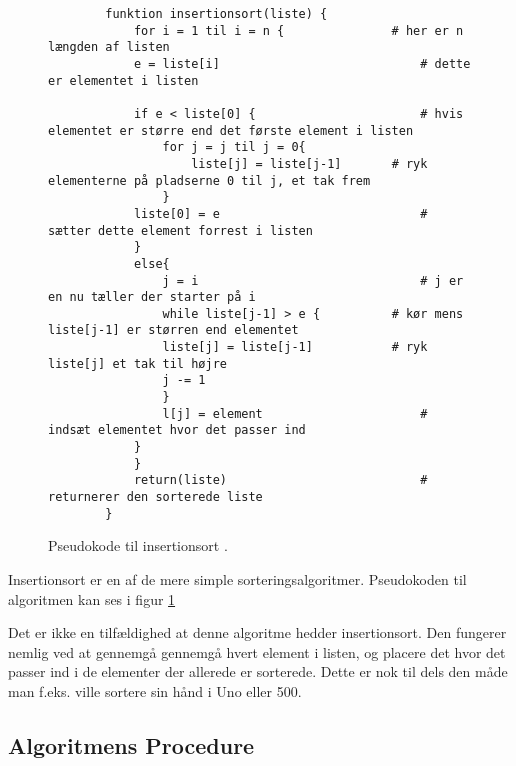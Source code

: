 \begin{figure}[h]
	\begin{center}

		\begin{lstlisting}
		funktion insertionsort(liste) {
			for i = 1 til i = n {				# her er n længden af listen
			e = liste[i]	 						# dette er elementet i listen

			if e < liste[0] {						# hvis elementet er større end det første element i listen
				for j = j til j = 0{ 
					liste[j] = liste[j-1]		# ryk elementerne på pladserne 0 til j, et tak frem
				}
			liste[0] = e 							# sætter dette element forrest i listen
			}
			else{
				j = i 								# j er en nu tæller der starter på i
				while liste[j-1] > e {			# kør mens liste[j-1] er størren end elementet
				liste[j] = liste[j-1] 			# ryk liste[j] et tak til højre
				j -= 1
				}
				l[j] = element						# indsæt elementet hvor det passer ind
			}
			}			
			return(liste)							# returnerer den sorterede liste
		}
		\end{lstlisting}
	\end{center}
	\vspace{-7mm}
	\caption{Pseudokode til insertionsort \cite[s. 104]{aogd}.}
	\label{fig:Pseudokode til insertionsort}
\end{figure}

Insertionsort er en af de mere simple sorteringsalgoritmer. Pseudokoden til algoritmen kan ses i figur \ref{fig:Pseudokode til insertionsort}


Det er ikke en tilfældighed at denne algoritme hedder insertionsort. Den fungerer nemlig ved at gennemgå gennemgå hvert element i listen, og placere det hvor det passer ind i de elementer der allerede er sorterede. Dette er nok til dels den måde man f.eks. ville sortere sin hånd i Uno eller 500. 

\subsection{Algoritmens Procedure}%
\label{sub:Algoritmens Procedure}

